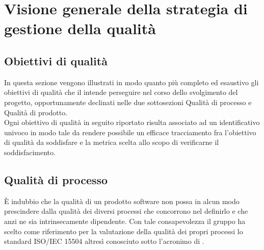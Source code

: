 \section{Visione generale della strategia di gestione della qualità}
	\subsection{Obiettivi di qualità}
	In questa sezione vengono illustrati in modo quanto più completo ed esaustivo gli obiettivi di qualità che il  intende perseguire nel corso 	dello svolgimento del progetto, opportunamente declinati nelle due sottosezioni Qualità di processo e Qualità di prodotto.
	\\Ogni obiettivo di qualità in seguito riportato risulta associato ad un identificativo univoco in modo tale da rendere possibile un efficace 				tracciamento fra l'obiettivo di qualità da soddisfare e la metrica scelta allo scopo di verificarne il soddisfacimento.

	\subsection{Qualità di processo}
	È indubbio che la qualità di un prodotto software non possa in alcun modo prescindere dalla qualità dei diversi processi che concorrono nel definirlo e 	che anzi ne sia intrinsecamente dipendente. Con tale consapevolezza il gruppo ha scelto come riferimento per la valutazione della qualità dei propri 		processi lo standard ISO/IEC 15504 altresì conosciuto sotto l'acronimo di .
